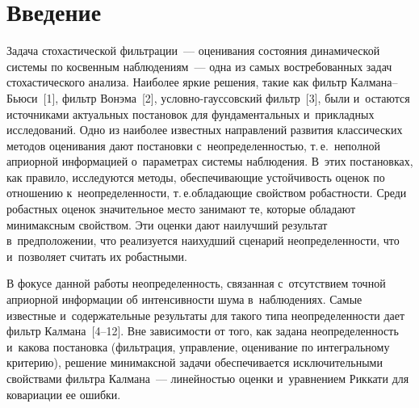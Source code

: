 
  
\vspace*{4pt}



\thispagestyle{headings}

\begin{multicols}{2}

\label{st\stat}

\section{Введение}

\vspace*{-2pt}

     Задача стохастической фильтрации~--- оценивания со\-сто\-яния 
динамической сис\-те\-мы по косвенным наблюдениям~--- одна из самых 
востребованных задач стохастического анализа. Наиболее яркие решения, 
такие как фильтр Кал\-ма\-на--Бьюси~[1], фильтр Вонэма~[2],  
услов\-но-гаус\-сов\-ский фильтр~[3], были и~остаются источниками 
актуальных по\-ста\-но\-вок для фундаментальных и~при\-клад\-ных исследований. 
Одно из наиболее известных на\-прав\-ле\-ний развития классических методов 
оценивания дают по\-ста\-нов\-ки с~не\-опре\-де\-лен\-ностью, т.\,е.\ неполной 
априорной информацией о~па\-ра\-мет\-рах сис\-те\-мы наблюдения. В~этих 
постановках, как правило, исследуются методы, обес\-пе\-чи\-вающие 
устой\-чи\-вость оценок по отношению к~не\-опре\-де\-лен\-ности, т.\,е.\linebreak об\-ла\-да\-ющие 
свойством ро\-баст\-ности. Среди робастных оценок значительное мес\-то 
занимают те, которые обладают минимаксным свойством. Эти оценки дают 
наилучший результат в~предположении, что реализуется наихудший 
сценарий не\-опре\-де\-лен\-ности, что и~поз\-во\-ля\-ет считать их ро\-баст\-ными.
     
     В фокусе данной работы неопределенность, связанная с~отсутствием 
точной априорной информации об ин\-тен\-сив\-ности шума в~наблюдениях. 
Самые известные и~содержательные результаты для такого типа 
не\-опре\-де\-лен\-ности дает фильтр Калмана~[4--12]. Вне за\-ви\-си\-мости от того, 
как задана не\-опре\-де\-лен\-ность и~какова постановка (фильт\-ра\-ция, управ\-ле\-ние, 
оценивание по интегральному критерию), решение ми\-ни\-макс\-ной задачи 
обеспечивается исключительными свойствами фильтра Калмана~--- 
ли\-ней\-ностью оценки и~уравнением Риккати для ковариации ее ошиб\-ки. 


\end{multicols}
